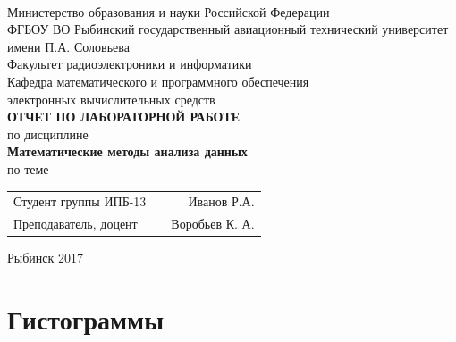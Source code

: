 \documentclass[a4paper,12pt]{article}
\begin{document}
\begin{titlepage}
\newpage

\

\begin{center}
	\large		
   	Министерство образования и науки Российской Федерации\\[0.5cm]
    	
	ФГБОУ ВО Рыбинский государственный авиационный технический университет имени П.А. Соловьева\\[1.0cm]

	Факультет радиоэлектроники и информатики\\[0.25cm]
		
	Кафедра математического и программного обеспечения\\ электронных вычислительных средств\\[1.5cm]

	\Large
	\textbf{\textsc{ОТЧЕТ ПО ЛАБОРАТОРНОЙ РАБОТЕ}}\\[0.25cm]
	по  дисциплине\\
	\textbf{Математические методы анализа данных}\\[0.5cm]
	
	по теме\\
	
\end{center}

\vfill	
\begin{tabularx}{0.95\textwidth}{lXr}
Студент группы ИПБ-13 & &	Иванов Р.А.\\
Преподаватель, доцент & &	Воробьев К. А.
\end{tabularx}

\vfill 
\center Рыбинск 2017
\end{titlepage}	

\tableofcontents
\setcounter{page}{2}

\newpage\section{Гистограммы} 
\end{document}
